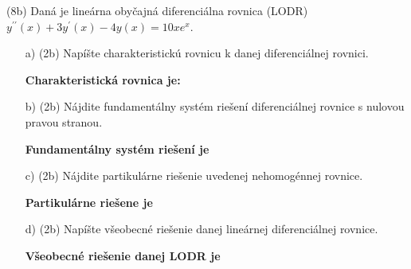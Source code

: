 \pr (8b) Daná je lineárna obyčajná diferenciálna rovnica (LODR)
$y^{\prime\prime}(x)+3y^{\prime}(x)-4y(x)= 10xe^x$.

\begin{enumerate}
\item[a)](2b) Napíšte charakteristickú rovnicu k danej diferenciálnej rovnici.
\medskip

\textbf{Charakteristická rovnica je:} \gr

\item[b)] (2b) Nájdite fundamentálny systém riešení diferenciálnej rovnice s nulovou pravou stranou.

\medskip

\textbf{Fundamentálny systém riešení je} \gr

\item[c)] (2b) Nájdite partikulárne riešenie uvedenej nehomogénnej rovnice.

\medskip

\textbf{Partikulárne riešene je} \gr

\item[d)] (2b) Napíšte všeobecné riešenie danej lineárnej diferenciálnej rovnice.

\medskip

\textbf{Všeobecné riešenie danej LODR je} \gr
\end{enumerate}
